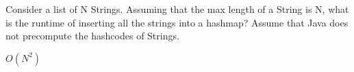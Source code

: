 
\question
Consider a list of N Strings. Assuming that the max length of a String is N, what is the runtime of inserting all the strings into a hashmap? Assume that Java does not precompute the hashcodes of Strings.
\begin{solution}[0.75in]
$O(N^2)$
\end{solution}
